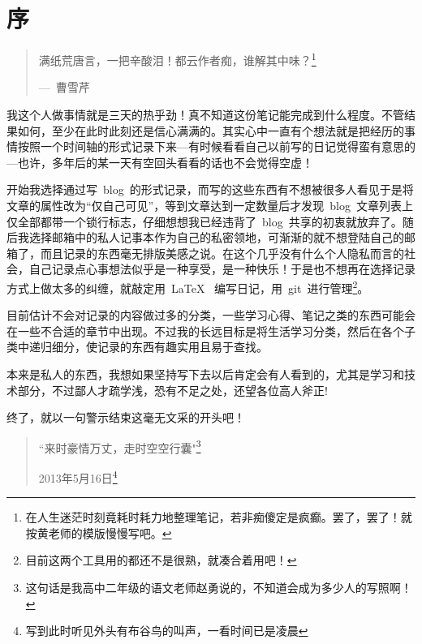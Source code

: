 \chapter{序}

\begin{quotation}
满纸荒唐言，一把辛酸泪！都云作者痴，谁解其中味？\footnote{在人生迷茫时刻竟耗时耗力地整理笔记，若非痴傻定是疯癫。罢了，罢了！就按黄老师的模版慢慢写吧。}
\begin{flushright}
---~曹雪芹
\end{flushright}
\end{quotation}

我这个人做事情就是三天的热乎劲！真不知道这份笔记能完成到什么程度。不管结果如何，至少在此时此刻还是信心满满的。其实心中一直有个想法就是把经历的事情按照一个时间轴的形式记录下来---有时候看看自己以前写的日记觉得蛮有意思的---也许，多年后的某一天有空回头看看的话也不会觉得空虚！

开始我选择通过写~blog~的形式记录，而写的这些东西有不想被很多人看见于是将文章的属性改为“仅自己可见”，等到文章达到一定数量后才发现~blog~文章列表上仅全部都带一个锁行标志，仔细想想我已经违背了~blog~共享的初衷就放弃了。随后我选择邮箱中的私人记事本作为自己的私密领地，可渐渐的就不想登陆自己的邮箱了，而且记录的东西毫无排版美感之说。在这个几乎没有什么个人隐私而言的社会，自己记录点心事想法似乎是一种享受，是一种快乐！于是也不想再在选择记录方式上做太多的纠缠，就敲定用~\LaTeX~ 编写日记，用~git~进行管理\footnote{目前这两个工具用的都还不是很熟，就凑合着用吧！}。

目前估计不会对记录的内容做过多的分类，一些学习心得、笔记之类的东西可能会在一些不合适的章节中出现。不过我的长远目标是将生活学习分类，然后在各个子类中递归细分，使记录的东西有趣实用且易于查找。

本来是私人的东西，我想如果坚持写下去以后肯定会有人看到的，尤其是学习和技术部分，不过鄙人才疏学浅，恐有不足之处，还望各位高人斧正!

终了，就以一句警示结束这毫无文采的开头吧！
\begin{quotation}
“来时豪情万丈，走时空空行囊"\footnote{这句话是我高中二年级的语文老师赵勇说的，不知道会成为多少人的写照啊！}
\begin{flushright}
\vspace{40mm}
2013年5月16日\footnote{写到此时听见外头有布谷鸟的叫声，一看时间已是凌晨}
\end{flushright}
\end{quotation}

